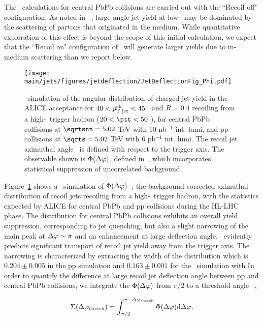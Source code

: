 The \jewel\ calculations for central PbPb collisions are carried out with the ``Recoil off" configuration. As noted in ~\cite{DEramo:2018eoy}, large-angle jet yield at low \ptjet\ may be dominated by the scattering of partons that originated in the medium. While quantitative exploration of this effect is beyond the scope of this initial calculation, we expect that the ``Recoil on" configuration of \jewel\ will generate larger yields due to in-medium scattering than we report below.

\begin{figure}[tbh!]
\centering
\texttt{[image: \\main/jets/figures/jetdeflection/JetDeflectionFig\_Phi.pdf]}
\caption{\jewel\ simulation of the angular distribution of charged jet yield in the ALICE acceptance for  $40<p_{\mathrm{T,jet}}^{\mathrm{ch}}<45$ \gevc\ and $R=0.4$ recoiling from a high-\pt\ trigger hadron ($20<\ptt<50$ \gevc), for central PbPb collisions at $\sqrtsnn=5.02$ TeV with 10 nb$^{-1}$ int. lumi, and pp collisions at $\sqrts=5.02$ TeV with 6 pb$^{-1}$ int. lumi. The recoil jet azimuthal angle \Dphi\ is defined with respect to the trigger axis. The observable shown is $\Phi(\Delta\varphi)$, defined in~\cite{Adam:2015doa}, which incorporates statistical suppression of uncorrelated background.
}
\label{fig:JetDeflectionPhi}
\end{figure}

Figure~\ref{fig:JetDeflectionPhi} shows a \jewel\ simulation of $\Phi(\Delta\varphi)$~\cite{Adam:2015doa}, the background-corrected azimuthal distribution of recoil jets recoiling from a high-\pT\ trigger hadron, with the statistics expected by ALICE for central PbPb and pp collisions during the HL-LHC phase. The distribution for central PbPb collisions exhibits an overall yield suppression, corresponding to jet quenching, but also a slight narrowing of the main peak at $\Delta\varphi\sim\pi$ and an enhancement at large deflection angle. \jewel\ evidently predicts significant transport of recoil jet yield away from the trigger axis. The narrowing is characterized by extracting the width of the distribution which is $0.204 \pm 0.005$ in the pp simulation and $0.163 \pm 0.001$ for the \PbPb\ simulation with \jewel\. 
In order to quantify the difference at large recoil jet deflection angle between pp and central PbPb collisions, we integrate the $\Phi(\Delta\varphi)$ from $\pi/2$ to a threshold angle \dphithresh~\cite{Adam:2015doa},

\begin{equation}
\Sigma(\Delta\varphi_{\mathrm{thresh}}) = 
\int_{\pi/2}^{\pi-\Delta\varphi_{\mathrm{thresh}}}
\Phi(\Delta\varphi)\mathrm{d}\Delta\varphi.
\label{eq:Sigma}
\end{equation}

